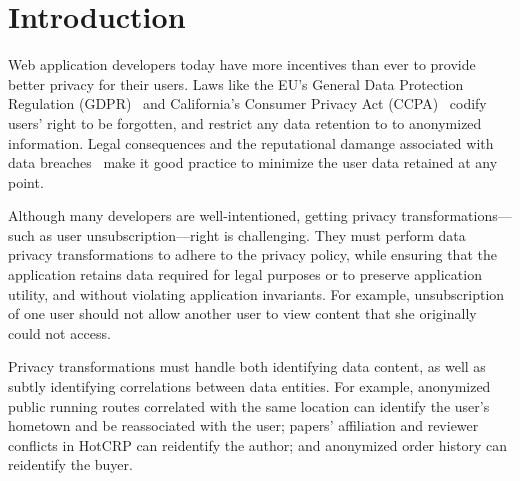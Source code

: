 \section{Introduction}
Web application developers today have more incentives than ever to provide better privacy for their
users.
%
Laws like the EU's General Data Protection Regulation (GDPR)~\cite{eu:gdpr} and California's
Consumer Privacy Act (CCPA)~\cite{ca:privacy-act} codify users' right to be forgotten, and restrict
any data retention to to anonymized information.
%
Legal consequences and the reputational damange associated with data breaches~\cite{breach:amazon,
breach:twitter, breach:fb, breach:marriott, breach:quora} make it good practice to minimize the user
data retained at any point.
%

%
Although many developers are well-intentioned, getting privacy transformations---such as user
unsubscription---right is challenging.
%
They must perform data privacy transformations to adhere to the privacy policy, while ensuring that
the application retains data required for legal purposes or to preserve application utility, and
without violating application invariants.
%
For example, unsubscription of one user should not allow another user to view content that she
originally could not access.


Privacy transformations must handle both identifying data content, as well as subtly identifying
correlations between data entities. For example, anonymized public running routes correlated with
the same location can identify the user's hometown and be reassociated with the user; 
papers' affiliation and reviewer conflicts in HotCRP can reidentify the author; and anonymized order
history can reidentify the buyer.

